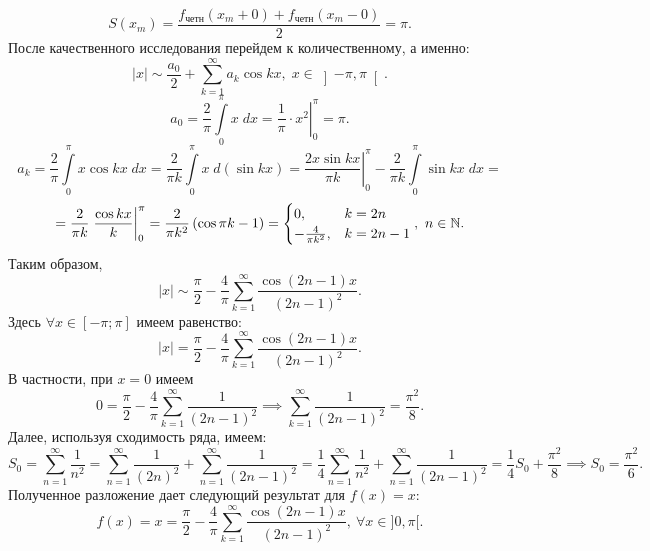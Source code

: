 \documentclass[../../main.tex]{subfiles}
\begin{document}
\begin{examples}
\begin{enumerate}
				\[
					S(x_m) = \frac{f_{\text{четн}}(x_m+0)+ f_{\text{четн}}(x_m-0)}{2} = \pi.
				\]
				После качественного исследования перейдем к количественному, а именно:
				\[
					|x| \sim \frac{a_0}{2} + \sum_{k=1}^{\infty}  a_k \cos k x, \; x \in 
					\left]-\pi, \pi\right[.
				\]
				\[
					a_0 = \frac{2}{\pi} \int\limits_{0}^{\pi}x\;dx = \left. \frac{1}{\pi}\cdot  x^2 \right|_0^{\pi} = \pi.
				\]
				\[
					a_k = \frac{2}{\pi} \int\limits_{0}^{\pi}x \cos kx\; dx = 
					\frac{2}{\pi k } \int\limits_{0}^{\pi}x\;d (\sin kx) = 
					\left. \frac{2x \sin kx}{\pi k}\right|_0^{\pi} - \frac{2}{\pi k} 
					\int\limits_{0}^{\pi}\sin kx\; dx = 
				\]
				\[
				 = \frac{2}{\pi k} \left. \frac{\cos k x}{k} \right|_0^{\pi} =
				 \frac{2}{\pi k^2} \left( \cos \pi k - 1 \right) = 
				 \begin{cases}
				 0,& k = 2n \\
				 -\frac{4}{\pi k^2},& k = 2n-1
				 \end{cases}, \ n \in \mathbb{N}.
				\]
				Таким образом,
				\[
					|x| \sim \frac{\pi}{2} - \frac{4}{\pi} 
					\sum_{k=1}^{\infty}\frac{\cos(2n-1)x}{(2n-1)^2}.
				\]
				Здесь $\forall x \in [-\pi; \pi]$ имеем равенство:
				\[
					|x| = \frac{\pi}{2} - \frac{4}{\pi} 
					\sum_{k=1}^{\infty}\frac{\cos(2n-1)x}{(2n-1)^2}.
				\]
				В частности, при $x = 0$ имеем
				\[
					0 = \frac{\pi}{2} - \frac{4}{\pi} \sum_{k=1}^{\infty}\frac{1}{(2n-1)^2} 
					\implies  \sum_{k=1}^{\infty}\frac{1}{(2n-1)^2} = \frac{\pi^2}{8}.
				\]
				Далее, используя сходимость ряда, имеем:
				\[
					S_0 = \sum_{n=1}^{\infty} \frac{1}{n^2} = \sum_{n=1}^{\infty} 
					\frac{1}{(2n)^2}  + \sum_{n=1}^{\infty} \frac{1}{(2n-1)^2} = 
					\frac{1}{4} \sum_{n=1}^{\infty} \frac{1}{n^2} +  \sum_{n=1}^{\infty} 
					\frac{1}{(2n-1)^2} =
					\frac{1}{4}S_0 + \frac{\pi^2}{8} \implies S_0 = \frac{\pi^2}{6}.
				\]
				Полученное разложение дает следующий результат для $f(x) = x$:
				\[
					f(x) = x = \frac{\pi}{2} - \frac{4}{\pi} 
					\sum_{k=1}^{\infty}\frac{\cos(2n-1)x}{(2n-1)^2}, \ \forall x \in ]0, \pi[.
				\]
			\end{enumerate}
		\end{examples}
\end{document}
